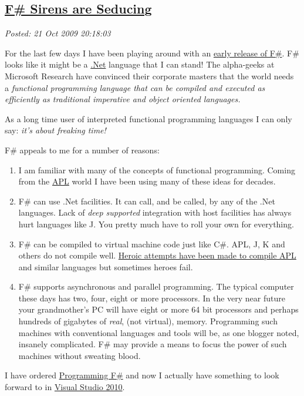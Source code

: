 %

\subsection*{\href{http://bakerjd99.wordpress.com/2009/10/21/f-sirens-are-seducing/}{F\# Sirens are Seducing}}


\noindent\emph{Posted: 21 Oct 2009 20:18:03}
\vspace{6pt}

For the last few days I have been playing around with an
\href{http://research.microsoft.com/en-us/um/cambridge/projects/fsharp/}{early
release of F\#}. F\# looks like it might be a
\href{http://www.microsoft.com/NET/}{.Net} language that I can stand!
The alpha-geeks at Microsoft Research have convinced their corporate
masters that the world needs a \emph{functional programming language
that can be compiled and executed as efficiently as traditional
imperative and object oriented languages.}

As a long time user of interpreted functional programming languages I
can only say: \emph{it's about freaking time!}

F\# appeals to me for a number of reasons:

\begin{enumerate}
\item
  I am familiar with many of the concepts of functional programming.
  Coming from the
  \href{http://en.wikipedia.org/wiki/APL\_(programming\_language)}{APL}
  world I have been using many of these ideas for decades.
\item
  F\# can use .Net facilities. It can call, and be called, by any of the
  .Net languages. Lack of \emph{deep supported} integration with host
  facilities has always hurt languages like J. You pretty much have to
  roll your own for everything.
\item
  F\# can be compiled to virtual machine code just like C\#. APL, J, K
  and others do not compile well.
  \href{http://www.snakeisland.com/}{Heroic attempts have been made to
  compile APL} and similar languages but sometimes heroes fail.
\item
  F\# supports asynchronous and parallel programming. The typical
  computer these days has two, four, eight or more processors. In the
  very near future your grandmother's PC will have eight or more 64 bit
  processors and perhaps hundreds of gigabytes of \emph{real}, (not
  virtual), memory. Programming such machines with conventional
  languages and tools will be, as one blogger noted, insanely
  complicated. F\# may provide a means to focus the power of such
  machines without sweating blood.
\end{enumerate}
I have ordered
\href{http://oreilly.com/catalog/9780596153656}{Programming F\#} and now
I actually have something to look forward to in
\href{http://www.microsoft.com/visualstudio/en-us/products/2010/default.mspx}{Visual
Studio 2010}.


%